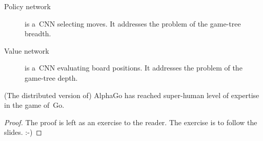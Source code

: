 \documentclass[a4paper,10pt]{article}
\begin{document}
\begin{description}
  \item [Policy network] is a~CNN selecting moves.
    It addresses the problem of the game-tree breadth.
  \item [Value network] is a~CNN evaluating board positions.
    It addresses the problem of the game-tree depth.
\end{description}

\begin{theorem}
  (The distributed version of) AlphaGo has reached super-human level of expertise in the game of~Go.
\end{theorem}

\begin{proof}
  The proof is left as an exercise to the reader.
  The exercise is to follow the slides.
  :-)
\end{proof}

% 
% 
% 
% 
% 
% 
% 
% 
% 
% 
% 
% 
% 
% 
\end{document}
